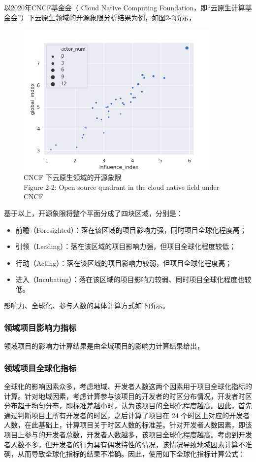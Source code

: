 \par 以2020年CNCF基金会（ Cloud Native Computing Foundation，即“云原生计算基金会”）下云原生领域的开源象限分析结果为例，如图2-2所示，
\begin{figure}[H]
    \centering
    \includegraphics[width=100mm]{./figures/开源象限.png}
    \caption{CNCF 下云原生领域的开源象限\\Figure 2-2: Open source quadrant in the cloud native field under CNCF}
\end{figure}
基于以上，开源象限将整个平面分成了四块区域，分别是：
\begin{itemize}
    \item 前瞻（Foresighted）：落在该区域的项目影响力强，同时项目全球化程度高；
    \item 引领（Leading）：落在该区域的项目影响力强，但项目全球化程度较低；
    \item 行动（Acting）：落在该区域的项目影响力较弱，但项目全球化程度高；
    \item 进入（Incubating）：落在该区域的项目影响力较弱、同时项目全球化程度也较低。
\end{itemize}
\par 影响力、全球化、参与人数的具体计算方式如下所示。

\subsubsection{领域项目影响力指标}
\par 领域项目的影响力计算结果是由全域项目的影响力计算结果给出，%

\subsubsection{领域项目全球化指标}
\par 全球化的影响因素众多，考虑地域、开发者人数这两个因素用于项目全球化指标的计算。针对地域因素，考虑计算参与该项目的开发者的时区分布情况，开发者时区分布趋于均匀分布，即标准差越小时，认为该项目的全球化程度越高。因此，首先通过判断项目上所有开发者的时区，之后计算了项目在 24 个时区上对应的开发者人数，在此基础上，计算项目关于时区人数的标准差。针对开发者人数因素，即该项目上参与的开发者总数，开发者人数越多，该项目全球化程度越高。考虑到开发者人数不多，但开发者的行为具有偶发特性的情况，该情况导致地域因素计算不准确，从而导致全球化指标的结果不准确。因此，使用如下全球化指标计算公式：

